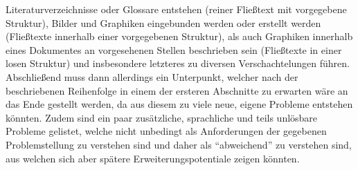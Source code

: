 Literaturverzeichnisse oder Glossare entstehen (reiner Fließtext mit vorgegebene Struktur),%
Bilder und Graphiken eingebunden werden oder erstellt werden (Fließtexte innerhalb einer vorgegebenen Struktur),%
als auch Graphiken innerhalb eines Dokumentes an vorgesehenen Stellen beschrieben sein (Fließtexte in einer losen Struktur) und insbesondere letzteres zu diversen Verschachtelungen führen.%
Abschließend muss dann allerdings ein Unterpunkt, welcher nach der beschriebenen Reihenfolge in einem der ersteren Abschnitte zu erwarten wäre an das Ende gestellt werden, da aus diesem zu viele neue, eigene Probleme entstehen könnten.%
Zudem sind ein paar zusätzliche, sprachliche und teils unlösbare Probleme gelistet, welche nicht unbedingt als Anforderungen der gegebenen Problemstellung zu verstehen sind und daher als \enquote{abweichend} zu verstehen sind, aus welchen sich aber spätere Erweiterungspotentiale zeigen könnten.

